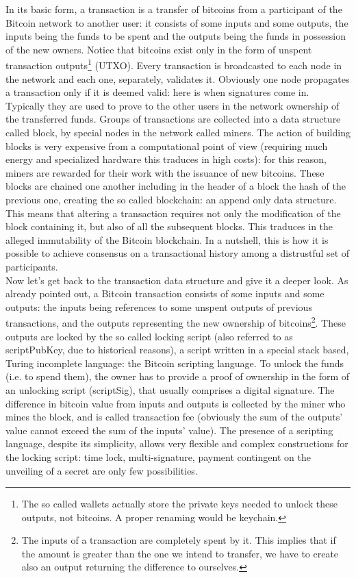 \bigskip
\noindent
In its basic form, a transaction is a transfer of bitcoins from a participant of the Bitcoin network to another user: it consists of some inputs and some outputs, the inputs being the funds to be spent and the outputs being the funds in possession of the new owners. Notice that bitcoins exist only in the form of unspent transaction outputs\footnote{The so called wallets actually store the private keys needed to unlock these outputs, not bitcoins. A proper renaming would be keychain.} (UTXO). Every transaction is broadcasted to each node in the network and each one, separately, validates it. Obviously one node propagates a transaction only if it is deemed valid: here is when signatures come in. Typically they are used to prove to the other users in the network ownership of the transferred funds. Groups of transactions are collected into a data structure called block, by special nodes in the network called miners. The action of building blocks is very expensive from a computational point of view (requiring much energy and specialized hardware this traduces in high costs): for this reason, miners are rewarded for their work with the issuance of new bitcoins. These blocks are chained one another including in the header of a block the hash of the previous one, creating the so called blockchain: an append only data structure. This means that altering a transaction requires not only the modification of the block containing it, but also of all the subsequent blocks. This traduces in the alleged immutability of the Bitcoin blockchain. In a nutshell, this is how it is possible to achieve consensus on a transactional history among a distrustful set of participants.
\\
Now let's get back to the transaction data structure and give it a deeper look. As already pointed out, a Bitcoin transaction consists of some inputs and some outputs: the inputs being references to some unspent outputs of previous transactions, and the outputs representing the new ownership of bitcoins\footnote{The inputs of a transaction are completely spent by it. This implies that if the amount is greater than the one we intend to transfer, we have to create also an output returning the difference to ourselves.}. These outputs are locked by the so called locking script (also referred to as scriptPubKey, due to historical reasons), a script written in a special stack based, Turing incomplete language: the Bitcoin scripting language. To unlock the funds (i.e. to spend them), the owner has to provide a proof of ownership in the form of an unlocking script (scriptSig), that usually comprises a digital signature. The difference in bitcoin value from inputs and outputs is collected by the miner who mines the block, and is called transaction fee (obviously the sum of the outputs' value cannot exceed the sum of the inputs' value). The presence of a scripting language, despite its simplicity, allows very flexible and complex constructions for the locking script: time lock, multi-signature, payment contingent on the unveiling of a secret are only few possibilities.

